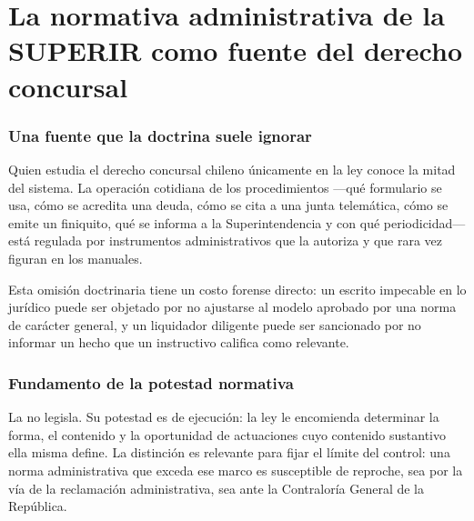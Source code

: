 \chapter{La normativa administrativa de la SUPERIR como fuente del derecho concursal}
\label{cap:normativa-superir}


\bloqueTeorico

\subsection{Una fuente que la doctrina suele ignorar}

Quien estudia el derecho concursal chileno únicamente en la ley conoce la mitad del
sistema. La operación cotidiana de los procedimientos ---qué formulario se usa, cómo se
acredita una deuda, cómo se cita a una junta telemática, cómo se emite un finiquito, qué
se informa a la Superintendencia y con qué periodicidad--- está regulada por instrumentos
administrativos que la \LIR{} \citeyearpar{ley-20720} autoriza y que rara vez figuran en
los manuales.

Esta omisión doctrinaria tiene un costo forense directo: un escrito impecable en lo
jurídico puede ser objetado por no ajustarse al modelo aprobado por una norma de carácter
general, y un liquidador diligente puede ser sancionado por no informar un hecho que un
instructivo califica como relevante.

\subsection{Fundamento de la potestad normativa}

La \superir{} no legisla. Su potestad es de ejecución: la ley le encomienda determinar la
forma, el contenido y la oportunidad de actuaciones cuyo contenido sustantivo ella misma
define. La distinción es relevante para fijar el límite del control: una norma
administrativa que exceda ese marco es susceptible de reproche, sea por la vía de la
reclamación administrativa, sea ante la Contraloría General de la República.

